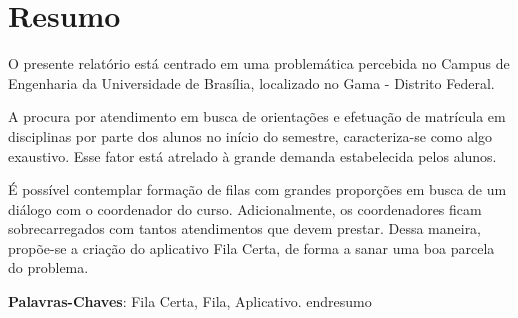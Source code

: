 \chapter[Resumo]{Resumo}
\label{chap:resumo}
	O presente relatório está centrado em uma problemática percebida no Campus de Engenharia da Universidade de Brasília, localizado no Gama - Distrito Federal.

	A procura por atendimento em busca de orientações e efetuação de matrícula em disciplinas por parte dos alunos no início do semestre, caracteriza-se como algo exaustivo. Esse fator está atrelado à grande demanda estabelecida pelos alunos.

	É possível contemplar formação de filas com grandes proporções em busca de um diálogo com o coordenador do curso. Adicionalmente, os coordenadores ficam sobrecarregados com tantos atendimentos que devem prestar. Dessa maneira, propõe-se a criação do aplicativo Fila Certa, de forma a sanar uma boa parcela do problema.

	\vspace{\onelineskip}
	   
	\noindent
	\textbf{Palavras-Chaves}: Fila Certa, Fila, Aplicativo.
	end{resumo}
